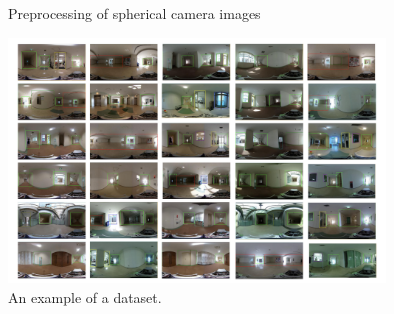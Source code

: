 \documentclass[../main]{subfiles}
\begin{document}
        \begin{figure}[htbp]
          \centering
           \caption{Preprocessing of spherical camera images}
           \label{figure::proc_exp}
        \end{figure}

        \begin{figure}[H]
         \centering
         \includegraphics[width=10cm]{../images/dataset_exp.png}
         \caption{An example of a dataset.}
         \label{figure::dataset_fig}
        \end{figure}
\end{document}
